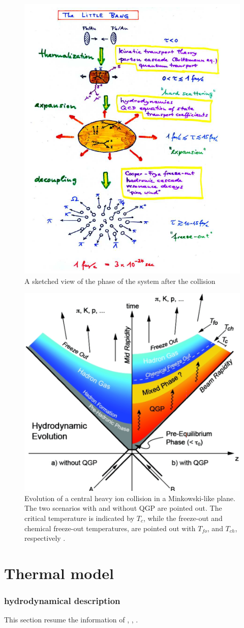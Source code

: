 \documentclass[12pt,a4paper]{book}
\begin{document}
	\begin{figure}[ht]
		\centering
		\includegraphics[width=0.6\linewidth]{pictures/collision_stage.png}
		\caption{A sketched view of the phase of the system after the collision}
		\label{fig::collision_stage} 
	\end{figure}
	
	\begin{figure}[ht]
		\centering
		\includegraphics[width=0.4\linewidth]{pictures/collision_stage_mikowsky.png}
		\caption{Evolution of a central heavy ion collision in a Minkowski-like plane. The two scenarios with and without QGP are pointed out. The critical temperature is indicated by $T_c$, while the freeze-out and chemical freeze-out temperatures, are pointed out with $T_{fo}$, and $T_{ch}$, respectively \cite{EvolutionofcollisionsandQGP}.}
		\label{fig:collision_stage_mikowsky} 
	\end{figure}
	
	\chapter{Thermal model}
	\subsection{hydrodynamical description}
	This section resume the information of \cite{heinz2004conceptsheavyionphysics}, \cite{phdthesis}, \cite{Cooper-Frye}.
	
\end{document}
